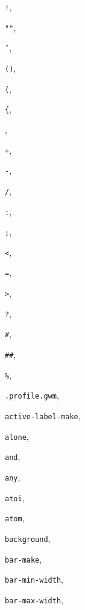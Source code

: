 
\begin{theindex}
\addtocounter{chapter}{1}

\item {\tt !}, {\bf\pageref{!}}
\item {\tt ""}, {\bf\pageref{""}}
\item {\tt '}, {\bf\pageref{'}}
\item {\tt ()}, {\bf\pageref{()}}
\item {\tt (}, {\bf\pageref{(}}
\item {\tt \{}, {\bf\pageref{progn}}
\item {\tt *}, {\bf\pageref{*}}
\item {\tt +}, {\bf\pageref{+}}
\item {\tt -}, {\bf\pageref{-}}
\item {\tt /}, {\bf\pageref{/}}
\item {\tt :}, {\bf\pageref{:}}
\item {\tt ;}, {\bf\pageref{;}}
\item {\tt <}, {\bf\pageref{<}}
\item {\tt =}, {\bf\pageref{=}}
\item {\tt >}, {\bf\pageref{>}}
\item {\tt ?}, {\bf\pageref{?}}
\item {\tt \#}, {\bf\pageref{nth}}
\item {\tt \#\#}, {\bf\pageref{replace-nth}}
\item {\tt \%}, {\bf\pageref{*}}
\item {\tt .profile.gwm}, {\bf\pageref{standard-profile}}
\item {\tt active-label-make}, {\bf\pageref{active-label-make}}
\item {\tt alone}, {\bf\pageref{alone}}
\item {\tt and}, {\bf\pageref{and}}
\item {\tt any}, {\bf\pageref{any}}
\item {\tt atoi}, {\bf\pageref{atoi}}
\item {\tt atom}, {\bf\pageref{atom}}
\item {\tt background}, {\bf\pageref{background}}
\item {\tt bar-make}, {\bf\pageref{bar-make}}
\item {\tt bar-min-width}, {\bf\pageref{bar-min-width}}
\item {\tt bar-max-width}, {\bf\pageref{bar-max-width}}

\end{theindex}
